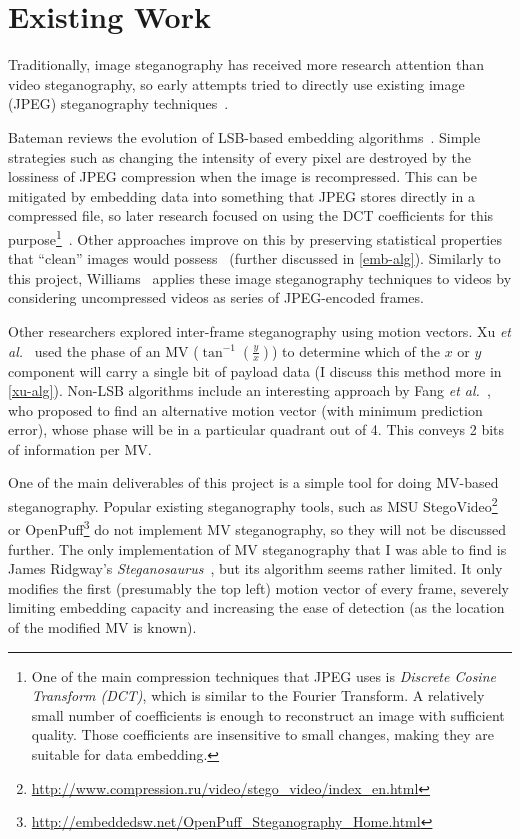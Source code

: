\documentclass[12pt,british,twoside,notitlepage,usenames,dvipsnames,hypens,final]{report}
\numberwithin{equation}{section}
\numberwithin{figure}{section}
\begin{document}
\section{Existing Work}

Traditionally, image steganography has received more research attention than video steganography, so early attempts tried to directly use existing image (JPEG) steganography techniques~\cite{bateman, jpegdctcoding}.

Bateman reviews the evolution of LSB-based embedding algorithms~\cite{bateman}. Simple strategies such as changing the intensity of every pixel are destroyed by the lossiness of JPEG compression when the image is recompressed. This can be mitigated by embedding data into something that JPEG stores directly in a compressed file, so later research focused on using the DCT coefficients for this purpose\footnote{
One of the main compression techniques that JPEG uses is \emph{Discrete Cosine Transform (DCT)}, which is similar to the Fourier Transform. A relatively small number of coefficients is enough to reconstruct an image with sufficient quality. Those coefficients are insensitive to small changes, making they are suitable for data embedding.}~\cite{jpegdctcoding}. Other approaches improve on this by preserving statistical properties that ``clean'' images would possess~\cite{bateman, f5} (further discussed in \ref{emb-alg}). Similarly to this project, Williams~\cite{scott-fs} applies these image steganography techniques to videos by considering uncompressed videos as series of JPEG-encoded frames.

Other researchers explored inter-frame steganography using motion vectors. Xu \emph{et al.}~\cite{xu2006steganography} used the phase of an MV ($\tan^{-1}(\frac{y}{x})$) to determine which of the $x$ or $y$ component will carry a single bit of payload data (I discuss this method more in \ref{xu-alg}). Non-LSB algorithms include an interesting approach by Fang \emph{et al.}~\cite{fang2006data}, who proposed to find an alternative motion vector (with minimum prediction error), whose phase will be in a particular quadrant out of 4. This conveys 2 bits of information per MV.

One of the main deliverables of this project is a simple tool for doing MV-based steganography. Popular existing steganography tools, such as MSU StegoVideo\footnote{\url{http://www.compression.ru/video/stego_video/index_en.html}} or OpenPuff\footnote{\url{http://embeddedsw.net/OpenPuff_Steganography_Home.html}} do not implement MV steganography, so they will not be discussed further. The only implementation of MV steganography that I was able to find is James Ridgway's \emph{Steganosaurus}~\cite{steganosaurus}, but its algorithm seems rather limited. It only modifies the first (presumably the top left) motion vector of every frame, severely limiting embedding capacity and increasing the ease of detection (as the location of the modified MV is known).
\end{document}
